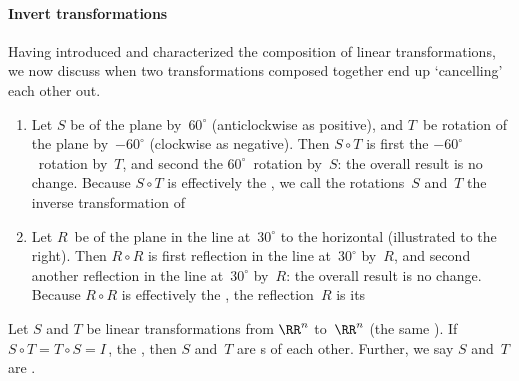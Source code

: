 \paragraph{Invert transformations}
Having introduced and characterized the composition of linear transformations, we now discuss when two transformations composed together end up `cancelling' each other out.

\begin{example} 
\begin{enumerate}
\item Let \(S\) be  of the plane by~\(60^\circ\) (anticlockwise as positive), and \(T\)~be rotation of the plane by~\(-60^\circ\) (clockwise as negative).
Then \(S\circ T\) is first the \(-60^\circ\)~rotation by~\(T\), and second the \(60^\circ\)~rotation by~\(S\): the overall result is no change.
Because \(S\circ T\) is effectively the , we call the rotations~\(S\) and~\(T\) the inverse transformation of 

\item 
\begin{figbox}{}
Let \(R\)~be  of the plane in the line at~\(30^\circ\) to the horizontal (illustrated to the right).  
Then \(R\circ R\) is first reflection in the line at~\(30^\circ\) by~\(R\), and second another reflection in the line at~\(30^\circ\) by~\(R\): the overall result is no change.
Because \(R\circ R\) is effectively the , the reflection~\(R\) is its 
\end{figbox}
\end{enumerate}
\end{example}



\begin{definition} \label{def:invLT} 
Let \(S\) and \(T\) be linear transformations from \(\RR^n\) to~\(\RR^n\) (the same ).
If \(S\circ T=T\circ S=I\)\,, the , then \(S\) and~\(T\) are s of each other.  
Further, we say \(S\) and~\(T\) are .
\end{definition}



